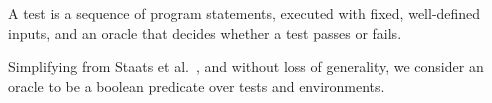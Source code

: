 \begin{definition}[Test]
%

A test is a sequence of program statements, executed with fixed,
well-defined inputs, and an oracle that
decides whether a test passes or fails.
\end{definition}



Simplifying from Staats
et al.~\cite{staatsetal:ICSE:2011}, and without loss of generality,
we consider an oracle to be a boolean predicate over tests and environments.


